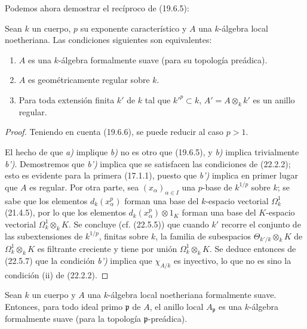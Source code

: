 Podemos ahora demostrar el recíproco de (19.6.5):

\begin{theorem}[22.5.8]
\label{0.22.5.8-fr}
Sean $k$ un cuerpo, $p$ su exponente característico y $A$ una $k$-álgebra
local noetheriana. Las condiciones siguientes son equivalentes:
\begin{enumerate}
  \item[\textup{a)}] $A$ es una $k$-álgebra formalmente suave (para su topología
  preádica).
  \item[\textup{b)}] $A$ es geométricamente regular sobre $k$.
  \item[\textup{b')}] Para toda extensión finita $k'$ de $k$ tal que $k'^p\subset k$,
  $A'=A\otimes_kk'$ es un anillo regular.
\end{enumerate}
\end{theorem}

\begin{proof}
Teniendo en cuenta (19.6.6), se puede reducir al caso $p>1$.

El hecho de que \emph{a)} implique \emph{b)} no es otro que (19.6.5), y \emph{b)} implica
trivialmente \emph{b')}. Demostremos que \emph{b')} implica que se satisfacen las condiciones de
(22.2.2); esto es evidente para la primera (17.1.1), puesto que \emph{b')} implica
en primer lugar que $A$ es regular. Por otra parte, sea $(x_\alpha)_{\alpha\in I}$ una
$p$-base de $k^{1/p}$ sobre $k$; se sabe que los elementos $d_k(x_\alpha^p)$
forman una base del $k$-espacio vectorial $\Omega^1_k$ (21.4.5), por lo que los
elementos $d_k(x_\alpha^p)\otimes1_K$ forman una base del $K$-espacio vectorial
$\Omega^1_k\otimes_kK$. Se concluye (cf. (22.5.5)) que cuando $k'$ recorre
el conjunto de las subextensiones de $k^{1/p}$, finitas sobre $k$, la familia de
subespacios $\Theta_{k'/k}\otimes_kK$ de $\Omega^1_k\otimes_kK$ es filtrante
creciente y tiene por unión $\Omega^1_k\otimes_kK$. Se deduce entonces de
(22.5.7) que la condición \emph{b')} implica que $\chi_{A/k}$ es inyectivo, lo que
no es sino la condición (ii) de (22.2.2).
\end{proof}

\begin{corollary}[22.5.9]
\label{0.22.5.9-fr}
Sean $k$ un cuerpo y $A$ una $k$-álgebra local noetheriana formalmente
suave. Entonces, para todo ideal primo $\mathfrak p$ de $A$, el anillo local
$A_{\mathfrak p}$ es una $k$-álgebra formalmente suave (para la topología
$\mathfrak p$-preádica).
\end{corollary}


